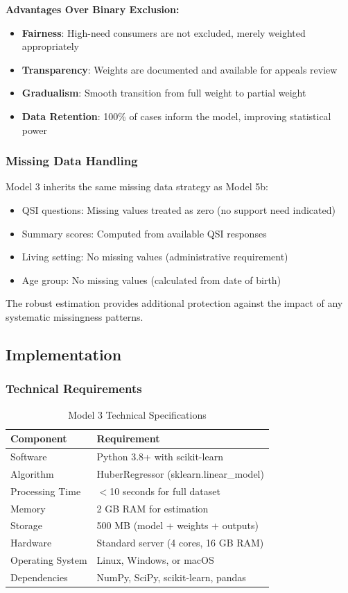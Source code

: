 \textbf{Advantages Over Binary Exclusion:}
\begin{itemize}
    \item \textbf{Fairness}: High-need consumers are not excluded, merely weighted appropriately
    \item \textbf{Transparency}: Weights are documented and available for appeals review
    \item \textbf{Gradualism}: Smooth transition from full weight to partial weight
    \item \textbf{Data Retention}: 100\% of cases inform the model, improving statistical power
\end{itemize}

\subsubsection{Missing Data Handling}

Model 3 inherits the same missing data strategy as Model 5b:
\begin{itemize}
    \item QSI questions: Missing values treated as zero (no support need indicated)
    \item Summary scores: Computed from available QSI responses
    \item Living setting: No missing values (administrative requirement)
    \item Age group: No missing values (calculated from date of birth)
\end{itemize}

The robust estimation provides additional protection against the impact of any systematic missingness patterns.

\subsection{Implementation}

\subsubsection{Technical Requirements}

\begin{table}[h]
\centering
\caption{Model 3 Technical Specifications}
\begin{tabular}{ll}
\toprule
\textbf{Component} & \textbf{Requirement} \\
\midrule
Software & Python 3.8+ with scikit-learn \\
Algorithm & HuberRegressor (sklearn.linear\_model) \\
Processing Time & $<$10 seconds for full dataset \\
Memory & 2 GB RAM for estimation \\
Storage & 500 MB (model + weights + outputs) \\
Hardware & Standard server (4 cores, 16 GB RAM) \\
Operating System & Linux, Windows, or macOS \\
Dependencies & NumPy, SciPy, scikit-learn, pandas \\
\bottomrule
\end{tabular}
\end{table}

